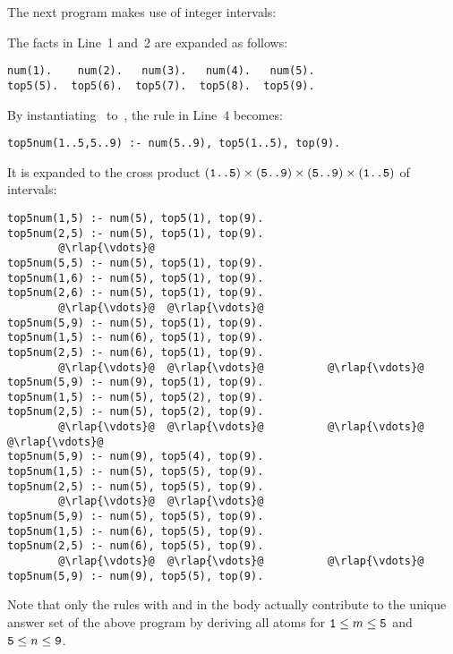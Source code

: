 \begin{example}\label{ex:int}
The next program makes use of integer intervals:
%

%
The facts in Line~1 and~2 are expanded as follows:
%
\begin{lstlisting}[numbers=none]
num(1).    num(2).   num(3).   num(4).   num(5).
top5(5).  top5(6).  top5(7).  top5(8).  top5(9).
\end{lstlisting}
%
By instantiating~ to~,
the rule in Line~4 becomes:
%
\begin{lstlisting}[numbers=none]
top5num(1..5,5..9) :- num(5..9), top5(1..5), top(9).
\end{lstlisting}
%
It is expanded to the cross product
$(\texttt{\texttt{1}..\texttt{5}})\times
 (\texttt{\texttt{5}..\texttt{9}})\times
 (\texttt{\texttt{5}..\texttt{9}})\times
 (\texttt{\texttt{1}..\texttt{5}})$
of intervals:
%
\begin{lstlisting}[numbers=none,escapechar=@]
top5num(1,5) :- num(5), top5(1), top(9).
top5num(2,5) :- num(5), top5(1), top(9).
        @\rlap{\vdots}@
top5num(5,5) :- num(5), top5(1), top(9).
top5num(1,6) :- num(5), top5(1), top(9).
top5num(2,6) :- num(5), top5(1), top(9).
        @\rlap{\vdots}@  @\rlap{\vdots}@
top5num(5,9) :- num(5), top5(1), top(9).
top5num(1,5) :- num(6), top5(1), top(9).
top5num(2,5) :- num(6), top5(1), top(9).
        @\rlap{\vdots}@  @\rlap{\vdots}@          @\rlap{\vdots}@
top5num(5,9) :- num(9), top5(1), top(9).
top5num(1,5) :- num(5), top5(2), top(9).
top5num(2,5) :- num(5), top5(2), top(9).
        @\rlap{\vdots}@  @\rlap{\vdots}@          @\rlap{\vdots}@         @\rlap{\vdots}@
top5num(5,9) :- num(9), top5(4), top(9).
top5num(1,5) :- num(5), top5(5), top(9).
top5num(2,5) :- num(5), top5(5), top(9).
        @\rlap{\vdots}@  @\rlap{\vdots}@
top5num(5,9) :- num(5), top5(5), top(9).
top5num(1,5) :- num(6), top5(5), top(9).
top5num(2,5) :- num(6), top5(5), top(9).
        @\rlap{\vdots}@  @\rlap{\vdots}@          @\rlap{\vdots}@
top5num(5,9) :- num(9), top5(5), top(9).
\end{lstlisting}
%
Note that only the rules with
 and
%
in the body actually contribute to the unique answer set
of the above program by deriving all atoms 
for $\texttt{1}\leq m\leq\texttt{5}$ and $\texttt{5}\leq n\leq\texttt{9}$.
\eexample
\end{example}

